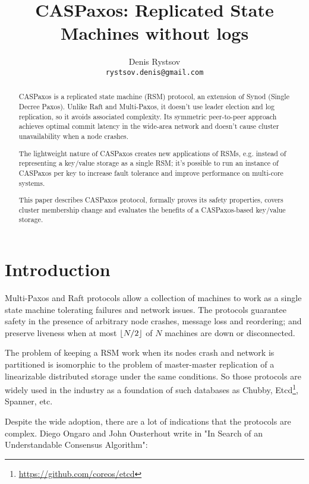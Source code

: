 \documentclass[12pt]{article}
\theoremstyle{definition}
\DeclarePairedDelimiter{\floor}{\lfloor}{\rfloor}
\begin{document}
\title{CASPaxos: Replicated State Machines without logs}

\author{Denis Rystsov\\\texttt{rystsov.denis@gmail.com}}

\maketitle

\begin{abstract}
CASPaxos is a replicated state machine (RSM) protocol, an extension of Synod (Single Decree Paxos). Unlike Raft and Multi-Paxos, it doesn't use leader election and log replication, so it avoids associated complexity. Its symmetric peer-to-peer approach achieves optimal commit latency in the wide-area network and doesn't cause cluster unavailability when a node crashes.

The lightweight nature of CASPaxos creates new applications of RSMs, e.g. instead of representing a key/value storage as a single RSM; it's possible to run an instance of CASPaxos per key to increase fault tolerance and improve performance on multi-core systems.

This paper describes CASPaxos protocol, formally proves its safety properties, covers cluster membership change and evaluates the benefits of a CASPaxos-based key/value storage.
\end{abstract}

\section{Introduction}

Multi-Paxos\cite{lamport01} and Raft\cite{raft} protocols allow a collection of machines to work as a single state machine tolerating failures and network issues. The protocols guarantee safety in the presence of arbitrary node crashes, message loss and reordering; and preserve liveness when at most $\floor{N/2}$ of $N$ machines are down or disconnected.

The problem of keeping a RSM work when its nodes crash and network is partitioned is isomorphic to the problem of master-master replication of a linearizable distributed storage under the same conditions. So those protocols are widely used in the industry as a foundation of such databases as Chubby\cite{chubby}, Etcd\footnote{\href{https://github.com/coreos/etcd}{https://github.com/coreos/etcd}}, Spanner\cite{spanner}, etc.

Despite the wide adoption, there are a lot of indications that the protocols are complex. Diego Ongaro and John Ousterhout write in "In Search of an Understandable Consensus Algorithm"\cite{raft}:
\end{document}
